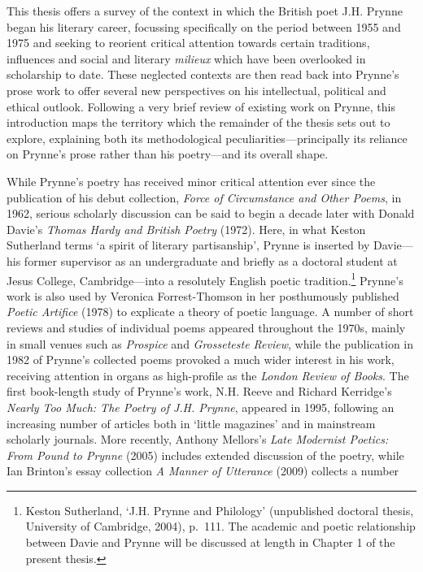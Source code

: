 \documentclass[]{article}
\begin{document}
\noindent This thesis offers a survey of the context in which the
British poet J.H. Prynne began his literary career, focussing
specifically on the period between 1955 and 1975 and seeking to reorient
critical attention towards certain traditions, influences and social and
literary \emph{milieux} which have been overlooked in scholarship to
date. These neglected contexts are then read back into Prynne’s prose
work to offer several new perspectives on his intellectual, political
and ethical outlook. Following a very brief review of existing work on
Prynne, this introduction maps the territory which the remainder of the
thesis sets out to explore, explaining both its methodological
peculiarities—principally its reliance on Prynne’s prose rather than his
poetry—and its overall shape.

While Prynne’s poetry has received minor critical attention ever since
the publication of his debut collection, \emph{Force of Circumstance and
Other Poems}, in 1962, serious scholarly discussion can be said to begin
a decade later with Donald Davie’s \emph{Thomas Hardy and British
Poetry} (1972). Here, in what Keston Sutherland terms ‘a spirit of
literary partisanship’, Prynne is inserted by Davie—his former
supervisor as an undergraduate and briefly as a doctoral student at
Jesus College, Cambridge—into a resolutely English poetic
tradition.\footnote{Keston Sutherland, ‘J.H. Prynne and Philology’
  (unpublished doctoral thesis, University of Cambridge, 2004), p.~111.
  The academic and poetic relationship between Davie and Prynne will be
  discussed at length in Chapter 1 of the present thesis.} Prynne’s work
is also used by Veronica Forrest-Thomson in her posthumously published
\emph{Poetic Artifice} (1978) to explicate a theory of poetic language.
A number of short reviews and studies of individual poems appeared
throughout the 1970s, mainly in small venues such as \emph{Prospice} and
\emph{Grosseteste Review}, while the publication in 1982 of Prynne’s
collected poems provoked a much wider interest in his work, receiving
attention in organs as high-profile as the \emph{London Review of
Books}. The first book-length study of Prynne’s work, N.H. Reeve and
Richard Kerridge’s \emph{Nearly Too Much: The Poetry of J.H. Prynne},
appeared in 1995, following an increasing number of articles both in
‘little magazines’ and in mainstream scholarly journals. More recently,
Anthony Mellors’s \emph{Late Modernist Poetics: From Pound to Prynne}
(2005) includes extended discussion of the poetry, while Ian Brinton’s
essay collection \emph{A Manner of Utterance} (2009) collects a number
\end{document}
